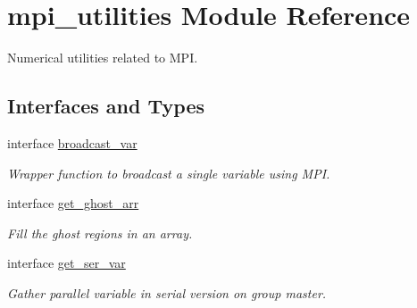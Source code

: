 \hypertarget{namespacempi__utilities}{}\section{mpi\+\_\+utilities Module Reference}
\label{namespacempi__utilities}


Numerical utilities related to M\+PI.  


\subsection*{Interfaces and Types}
\begin{DoxyCompactItemize}
\item 
interface \hyperlink{interfacempi__utilities_1_1broadcast__var}{broadcast\+\_\+var}
\begin{DoxyCompactList}\small\item\em Wrapper function to broadcast a single variable using M\+PI. \end{DoxyCompactList}\item 
interface \hyperlink{interfacempi__utilities_1_1get__ghost__arr}{get\+\_\+ghost\+\_\+arr}
\begin{DoxyCompactList}\small\item\em Fill the ghost regions in an array. \end{DoxyCompactList}\item 
interface \hyperlink{interfacempi__utilities_1_1get__ser__var}{get\+\_\+ser\+\_\+var}
\begin{DoxyCompactList}\small\item\em Gather parallel variable in serial version on group master. \end{DoxyCompactList}\end{DoxyCompactItemize}
